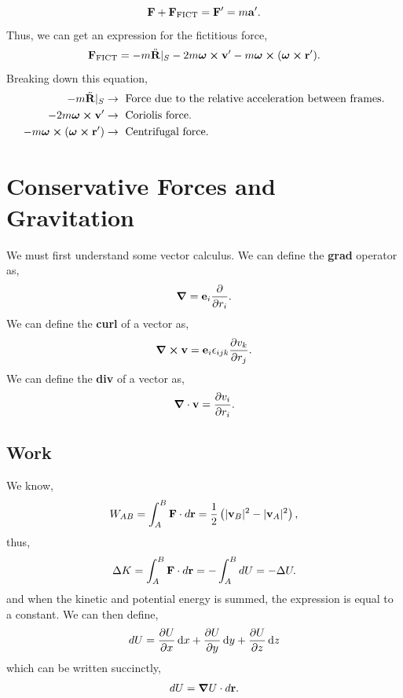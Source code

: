\documentclass{book}
\begin{document}
\begin{equation}
    \vb{F} + \vb{F}_{\text{FICT}} = \vb{F}' = m\vb{a}'.
\end{equation}
Thus, we can get an expression for the fictitious force,
\begin{equation}
    \vb{F}_{\text{FICT}} = -m\Ddot{\vb{R}}|_S - 2m\vb*{\omega}\cross\vb{v}' -m\vb*{\omega}\cross(\vb*{\omega}\cross\vb{r}').
\end{equation}
Breaking down this equation,
\begin{align}
    -m\Ddot{\vb{R}}|_S &\to \text{ Force due to the relative acceleration between frames.} \\
    - 2m\vb*{\omega}\cross\vb{v}' & \to \text{ Coriolis force.} \\
    -m\vb*{\omega}\cross(\vb*{\omega}\cross\vb{r}') & \to \text{ Centrifugal force.}
\end{align}

\chapter{Conservative Forces and Gravitation}
We must first understand some vector calculus. We can define the \textbf{grad} operator as,
\begin{equation}
    \grad = \vb{e}_i\pdv{}{r_i}.
\end{equation}
We can define the \textbf{curl} of a vector as,
\begin{equation}
    \grad \cross \vb{v} = \vb{e}_i \epsilon_{ijk}\pdv{v_k}{r_j}.
\end{equation}
We can define the \textbf{div} of a vector as,
\begin{equation}
    \grad\cdot\vb{v} = \pdv{v_i}{r_i}.
\end{equation}
\section{Work}
We know,
\begin{equation}
    W_{AB} = \int_A^B \vb{F}\cdot d\vb{r} = \frac{1}{2}\left(|\vb{v}_B|^2 - |\vb{v}_A|^2\right),
\end{equation}
thus,
\begin{equation}
    \Delta K = \int_A^B\vb{F}\cdot d\vb{r} = -\int_A^BdU = -\Delta U.
\end{equation}
and when the kinetic and potential energy is summed, the expression is equal to a constant. We can then define,
\begin{equation}
    dU = \pdv{U}{x}\dd{x} + \pdv{U}{y}\dd{y}+\pdv{U}{z}\dd{z}
\end{equation}
which can be written succinctly,
\begin{equation}
    dU = \grad U \cdot d\vb{r}.
\end{equation}
\end{document}
